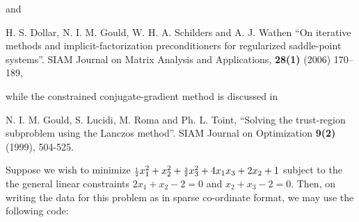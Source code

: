 \documentclass{galahad}
\begin{document}
\noindent
and

\noindent
H. S. Dollar, N. I. M. Gould, W. H. A. Schilders and A. J. Wathen
``On iterative methods and implicit-factorization preconditioners for 
regularized saddle-point systems''.
SIAM Journal on Matrix Analysis and Applications, {\bf 28(1)} (2006) 170--189,

\noindent
while the constrained conjugate-gradient method is discussed in
\vspace*{1mm}

\noindent  
N. I. M. Gould, S. Lucidi, M. Roma and Ph. L. Toint, 
``Solving the trust-region subproblem using the Lanczos method''. 
SIAM Journal on Optimization {\bf 9(2)} (1999), 504-525. 


\galexample
Suppose we wish to minimize
${\scriptstyle \frac{1}{2}} x_1^2 + x_2^2 + {\scriptstyle \frac{3}{2}} x_3^2 + 4 x_1 x_3 + 2 x_2 + 1$
subject to the the general linear constraints
$2 x_{1}  +  x_{2} - 2 = 0$ and
$x_{2} +  x_{3}  - 2 = 0$.
Then, on writing the data for this problem as
in sparse co-ordinate format,
we may use the following code:
\end{document}
